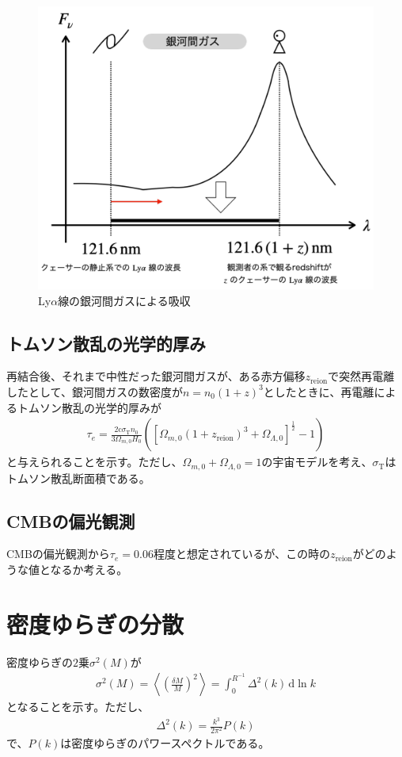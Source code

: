 \documentclass[a4paper,papersize,uplatex,dvipdfmx,10pt]{jsarticle}
\begin{document}
\begin{figure}
	\centering
	\includegraphics[width=0.6\linewidth]{fig/lyalpha.pdf}
	\caption{Ly$\alpha$線の銀河間ガスによる吸収 \label{fig_lya}}
\end{figure}

\subsection{トムソン散乱の光学的厚み}
再結合後、それまで中性だった銀河間ガスが、ある赤方偏移$z_{\mathrm{reion}}$で突然再電離したとして、銀河間ガスの数密度が$n=n_{0}(1+z)^{3}$としたときに、再電離によるトムソン散乱の光学的厚みが
\begin{align}
  \tau_{e} = \frac{2\mathrm{c}\sigma_{\mathrm{T}}n_{0}}{3\Omega_{m,0}H_{0}}\left( \left[ \Omega_{m,0}(1+z_{\mathrm{reion}})^{3}+\Omega_{\Lambda,0} \right]^{\frac{1}{2}}-1 \right)
\end{align}
と与えられることを示す。ただし、$\Omega_{m,0}+\Omega_{\Lambda,0}=1$の宇宙モデルを考え、$\sigma_{\mathrm{T}}$はトムソン散乱断面積である。

\subsection{CMBの偏光観測}
CMBの偏光観測から$\tau_{e}=0.06$程度と想定されているが、この時の$z_{\mathrm{reion}}$がどのような値となるか考える。

\section{密度ゆらぎの分散}
密度ゆらぎの$2$乗$\sigma^{2}(M)$が
\begin{align}
  \sigma^{2}(M) = \left< \left( \frac{\delta M}{M} \right)^{2} \right> = \int^{R^{-1}}_{0}\Delta^{2}(k)\,\mathrm{d}\ln{k}
\end{align}
となることを示す。ただし、
\begin{align}
  \Delta^{2}(k) = \frac{k^{3}}{2\pi^{2}}P(k)
\end{align}
で、$P(k)$は密度ゆらぎのパワースペクトルである。
\end{document}
